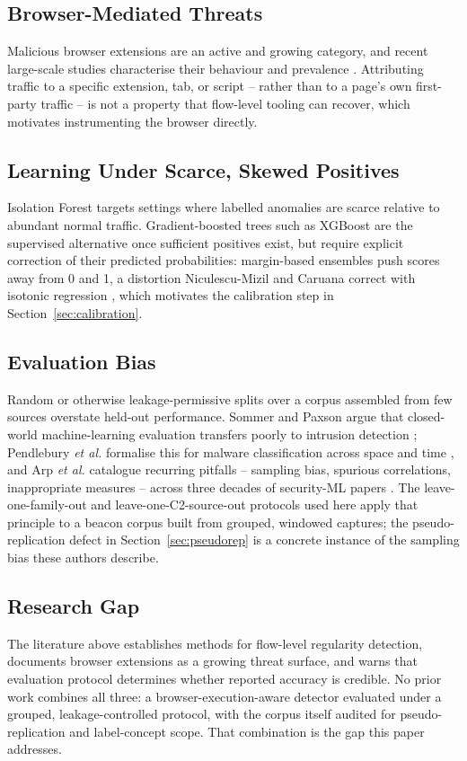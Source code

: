 \documentclass[conference,a4paper]{IEEEtran}
\begin{document}
\subsection{Browser-Mediated Threats}
Malicious browser extensions are an active and growing category, and recent large-scale studies characterise their behaviour and prevalence \cite{singh2025malicious}. Attributing traffic to a specific extension, tab, or script -- rather than to a page's own first-party traffic -- is not a property that flow-level tooling can recover, which motivates instrumenting the browser directly.

\subsection{Learning Under Scarce, Skewed Positives}
Isolation Forest \cite{liu2008isolationforest} targets settings where labelled anomalies are scarce relative to abundant normal traffic. Gradient-boosted trees such as XGBoost \cite{chen2016xgboost} are the supervised alternative once sufficient positives exist, but require explicit correction of their predicted probabilities: margin-based ensembles push scores away from 0 and 1, a distortion Niculescu-Mizil and Caruana correct with isotonic regression \cite{niculescumizil2005predicting}, which motivates the calibration step in Section~\ref{sec:calibration}.

\subsection{Evaluation Bias}
Random or otherwise leakage-permissive splits over a corpus assembled from few sources overstate held-out performance. Sommer and Paxson argue that closed-world machine-learning evaluation transfers poorly to intrusion detection \cite{sommer2010outside}; Pendlebury \emph{et al.} formalise this for malware classification across space and time \cite{pendlebury2019tesseract}, and Arp \emph{et al.} catalogue recurring pitfalls -- sampling bias, spurious correlations, inappropriate measures -- across three decades of security-ML papers \cite{arp2022dos}. The leave-one-family-out and leave-one-C2-source-out protocols used here apply that principle to a beacon corpus built from grouped, windowed captures; the pseudo-replication defect in Section~\ref{sec:pseudorep} is a concrete instance of the sampling bias these authors describe.

\subsection{Research Gap}
The literature above establishes methods for flow-level regularity detection, documents browser extensions as a growing threat surface, and warns that evaluation protocol determines whether reported accuracy is credible. No prior work combines all three: a browser-execution-aware detector evaluated under a grouped, leakage-controlled protocol, with the corpus itself audited for pseudo-replication and label-concept scope. That combination is the gap this paper addresses.
\end{document}
